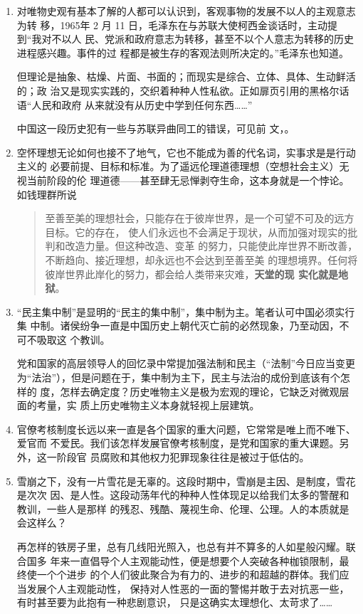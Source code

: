 \begin{enumerate}
\item 对唯物史观有基本了解的人都可以认识到，客观事物的发展不以人的主观意志为转
  移，1965年 2 月 11 日，毛泽东在与苏联大使柯西金谈话时，主动提到“我对不以人
  民、党派和政府意志为转移，甚至不以个人意志为转移的历史进程感兴趣。事件的过
  程都是被生存的客观法则所决定的。”毛泽东也知道。

  但理论是抽象、枯燥、片面、书面的；而现实是综合、立体、具体、生动鲜活的；政
  治又是现实实践的，交织着种种人性私欲。正如扉页引用的黑格尔话语“人民和政府
  从来就没有从历史中学到任何东西……”

  中国这一段历史犯有一些与苏联异曲同工的错误，可见前
  文，。

\item 空怀理想无论如何也接不了地气，它也不能成为善的代名词，实事求是是行动主义的
  必要前提、目标和标准。为了遥远伦理道德理想（空想社会主义）无视当前阶段的伦
  理道德——甚至肆无忌惮剥夺生命，这本身就是一个悖论。如钱理群所说
  \begin{quotation}
    至善至美的理想社会，只能存在于彼岸世界，是一个可望不可及的远方目标。它的存在，
    使人们永远也不会满足于现状，从而加强对现实的批判和改造力量。但这种改造、变革
    的努力，只能使此岸世界不断改善，不断趋向、接近理想，却永远也不会达到至善至美
    的理想境界。任何将彼岸世界此岸化的努力，都会给人类带来灾难，\textbf{天堂的现
      实化就是地狱}。
  \end{quotation}

\item “民主集中制”是显明的“民主的集中制”，集中制为主。笔者认可中国必须实行集
  中制。诸侯纷争一直是中国历史上朝代灭亡前的必然现象，乃至动因，不可不吸取这
  个教训。

  党和国家的高层领导人的回忆录中常提加强法制和民主（“法制”今日应当变更
  为“法治”），但是问题在于，集中制为主下，民主与法治的成份到底该有个怎样的
  度，怎样去确定度？历史唯物主义是极为宏观的理论，它缺乏对微观层面的考量，实
  质上历史唯物主义本身就轻视上层建筑。

\item 官僚考核制度长远以来一直是各个国家的重大问题，它常常是唯上而不唯下、爱官而
  不爱民。我们该怎样发展官僚考核制度，是党和国家的重大课题。另外，这一阶段官
  员腐败和其他权力犯罪现象往往是被过于低估的。

\item 雪崩之下，没有一片雪花是无辜的。这段时期中，雪崩是主因、是制度，雪花是次次
  因、是人性。这段动荡年代的种种人性体现足以给我们太多的警醒和教训，一些人是那样
  的残忍、残酷、蔑视生命、伦理、公理。人的本质就是会这样么？

  再怎样的铁房子里，总有几线阳光照入，也总有并不算多的人如星般闪耀。联合国多
  年来一直倡导个人主观能动性，便是想要个人突破各种枷锁限制，最终使一个个进步
  的个人们彼此聚合为有力的、进步的和超越的群体。我们应当发展个人主观能动性，
  保持对人性恶的一面的警惕并敢于去对抗恶一些，有时甚至要为此抱有一种悲剧意识，
  只是这确实太理想化、太苛求了……
\end{enumerate}

